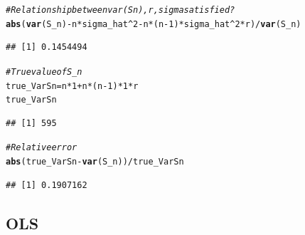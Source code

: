 \documentclass[11pt]{article}\usepackage[]{graphicx}\usepackage[]{color}
\makeatletter
\newcommand{\hlnum}[1]{\textcolor[rgb]{0.686,0.059,0.569}{#1}}%
\newcommand{\hlcom}[1]{\textcolor[rgb]{0.678,0.584,0.686}{\textit{#1}}}%
\newcommand{\hlopt}[1]{\textcolor[rgb]{0,0,0}{#1}}%
\newcommand{\hlstd}[1]{\textcolor[rgb]{0.345,0.345,0.345}{#1}}%
\newcommand{\hlkwb}[1]{\textcolor[rgb]{0.69,0.353,0.396}{#1}}%
\newcommand{\hlkwd}[1]{\textcolor[rgb]{0.737,0.353,0.396}{\textbf{#1}}}%
\newenvironment{kframe}{%
 \def\at@end@of@kframe{}%
 \ifinner\ifhmode%
  \def\at@end@of@kframe{\end{minipage}}%
  \begin{minipage}{\columnwidth}%
 \fi\fi%
 \def\FrameCommand##1{\hskip\@totalleftmargin \hskip-\fboxsep
 \colorbox{shadecolor}{##1}\hskip-\fboxsep
     \hskip-\linewidth \hskip-\@totalleftmargin \hskip\columnwidth}%
 \MakeFramed {\advance\hsize-\width
   \@totalleftmargin\z@ \linewidth\hsize
   \@setminipage}}%
 {\par\unskip\endMakeFramed%
 \at@end@of@kframe}
\newenvironment{knitrout}{}{} %
\makeatother
\begin{document}
\begin{knitrout}
\color{fgcolor}\begin{kframe}
\begin{alltt}
\hlcom{# Relationship between var(Sn), r, sigma satisfied?}
\hlkwd{abs}\hlstd{(}\hlkwd{var}\hlstd{(S_n)}\hlopt{-}\hlstd{n}\hlopt{*}\hlstd{sigma_hat}\hlopt{^}\hlnum{2}\hlopt{-}\hlstd{n}\hlopt{*}\hlstd{(n}\hlopt{-}\hlnum{1}\hlstd{)}\hlopt{*}\hlstd{sigma_hat}\hlopt{^}\hlnum{2}\hlopt{*}\hlstd{r)}\hlopt{/}\hlkwd{var}\hlstd{(S_n)}
\end{alltt}
\begin{verbatim}
## [1] 0.1454494
\end{verbatim}
\begin{alltt}
\hlcom{# True value of S_n}
\hlstd{true_VarSn} \hlkwb{=} \hlstd{n}\hlopt{*}\hlnum{1}\hlopt{+}\hlstd{n}\hlopt{*}\hlstd{(n}\hlopt{-}\hlnum{1}\hlstd{)}\hlopt{*}\hlnum{1}\hlopt{*}\hlstd{r}
\hlstd{true_VarSn}
\end{alltt}
\begin{verbatim}
## [1] 595
\end{verbatim}
\begin{alltt}
\hlcom{# Relative error}
\hlkwd{abs}\hlstd{(true_VarSn}\hlopt{-} \hlkwd{var}\hlstd{(S_n))}\hlopt{/}\hlstd{true_VarSn}
\end{alltt}
\begin{verbatim}
## [1] 0.1907162
\end{verbatim}
\end{kframe}
\end{knitrout}

\subsection{OLS}
\end{document}

